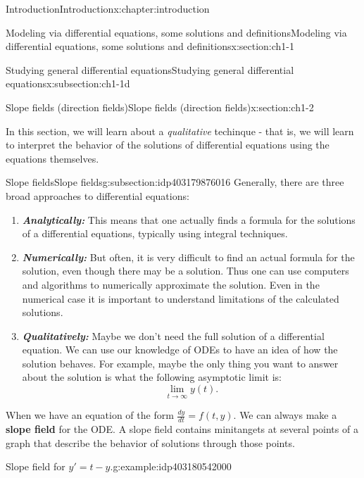 \documentclass[oneside,10pt,]{book}
\newcommand{\alert}[1]{\textbf{\textit{#1}}}
\newcommand{\terminology}[1]{\textbf{#1}}
\numberwithin{equation}{section}
\numberwithin{equation}{section}
\begin{document}
\begin{chapterptx}{Introduction}{}{Introduction}{}{}{x:chapter:introduction}
\begin{sectionptx}{Modeling via differential equations, some solutions and definitions}{}{Modeling via differential equations, some solutions and definitions}{}{}{x:section:ch1-1}
\begin{subsectionptx}{Studying general differential equations}{}{Studying general differential equations}{}{}{x:subsection:ch1-1d}
\end{subsectionptx}
\end{sectionptx}
%
%
\typeout{************************************************}
\typeout{************************************************}
%
\begin{sectionptx}{Slope fields (direction fields)}{}{Slope fields (direction fields)}{}{}{x:section:ch1-2}
\begin{introduction}{}%
In this section, we will learn about a \emph{qualitative} techinque - that is, we will learn to interpret the behavior of the solutions of differential equations using the equations themselves.%
\end{introduction}%
%
%
\typeout{************************************************}
\typeout{************************************************}
%
\begin{subsectionptx}{Slope fields}{}{Slope fields}{}{}{g:subsection:idp403179876016}
Generally, there are three broad approaches to differential equations:%
\begin{enumerate}
\item{}\alert{Analytically:} This means that one actually finds a formula for the solutions of a differential equations, typically using integral techniques.%
\item{}\alert{Numerically:} But often, it is very difficult to find an actual formula for the solution, even though there may be a solution. Thus one can use computers and algorithms to numerically approximate the solution. Even in the numerical case it is important to understand limitations of the calculated solutions.%
\item{}\alert{Qualitatively:} Maybe we don't need the full solution of a differential equation. We can use our knowledge of ODEs to have an idea of how the solution behaves. For example, maybe the only thing you want to answer about the solution is what the following asymptotic limit is:%
\begin{equation*}
\lim_{t\to\infty}y(t).
\end{equation*}
%
\end{enumerate}
%
\par
When we have an equation of the form \(\frac{dy}{dt}=f(t,y)\). We can always make a \terminology{slope field} for the ODE. A slope field contains minitangets at several points of a graph that describe the behavior of solutions through those points.%
\begin{example}{Slope field for \(y' = t - y\).}{g:example:idp403180542000}%

\end{example}
\end{subsectionptx}
\end{sectionptx}
\end{chapterptx}
\end{document}
